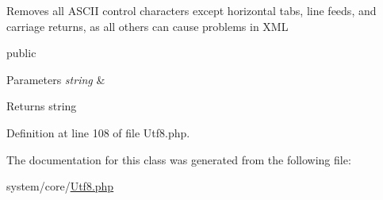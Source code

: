 Removes all A\-S\-C\-I\-I control characters except horizontal tabs, line feeds, and carriage returns, as all others can cause problems in X\-M\-L

public 
\begin{DoxyParams}{Parameters}
{\em string} & \\
\hline
\end{DoxyParams}
\begin{DoxyReturn}{Returns}
string 
\end{DoxyReturn}


Definition at line 108 of file Utf8.\-php.



The documentation for this class was generated from the following file\-:\begin{DoxyCompactItemize}
\item 
system/core/\hyperlink{_utf8_8php}{Utf8.\-php}\end{DoxyCompactItemize}
